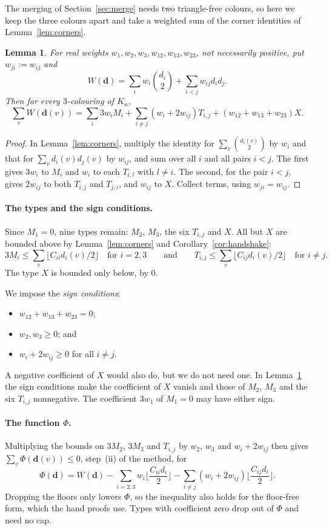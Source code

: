 \documentclass[11pt]{article}
\theoremstyle{spacedplain}
\newtheorem{lemma}[theorem]{Lemma}
\theoremstyle{spaceddef}
\theoremstyle{spacedremark}
\begin{document}
The merging of Section~\ref{sec:merge} needs two triangle-free colours, so here we keep the three colours apart and take a weighted sum of the corner identities of Lemma~\ref{lem:corners}.

\begin{lemma}\label{lem:weighted}
For real weights $w_1,w_2,w_3,w_{12},w_{13},w_{23}$, not necessarily positive, put $w_{ji}:=w_{ij}$ and
\[
W(\mathbf d)=\sum_i w_i\binom{d_i}{2}+\sum_{i<j}w_{ij}d_id_j .
\]
Then for every $3$-colouring of $K_n$,
\[
\sum_vW(\mathbf d(v))=\sum_i 3w_iM_i+\sum_{i\ne j}(w_i+2w_{ij})T_{i,j}+(w_{12}+w_{13}+w_{23})X .
\]
\end{lemma}

\begin{proof}
In Lemma~\ref{lem:corners}, multiply the identity for $\sum_v\binom{d_i(v)}2$ by $w_i$ and that for $\sum_v d_i(v)d_j(v)$ by $w_{ij}$, and sum over all $i$ and all pairs $i<j$.
The first gives $3w_i$ to $M_i$ and $w_i$ to each $T_{i,l}$ with $l\ne i$.
The second, for the pair $i<j$, gives $2w_{ij}$ to both $T_{i,j}$ and $T_{j,i}$, and $w_{ij}$ to $X$.
Collect terms, using $w_{ji}=w_{ij}$.
\end{proof}

\paragraph{The types and the sign conditions.}
Since $M_1=0$, nine types remain: $M_2$, $M_3$, the six $T_{i,j}$ and $X$.
All but $X$ are bounded above by Lemma~\ref{lem:corners} and Corollary~\ref{cor:handshake}:
\[
3M_i\le\sum_v\lfloor C_{ii}d_i(v)/2\rfloor\quad\text{for }i=2,3\qquad\text{and}\qquad T_{i,j}\le\sum_v\lfloor C_{ij}d_i(v)/2\rfloor\quad\text{for }i\ne j.
\]
The type $X$ is bounded only below, by $0$.

We impose the \emph{sign conditions}:
\begin{itemize}
\item $w_{12}+w_{13}+w_{23}=0$;
\item $w_2,w_3\ge 0$; and
\item $w_i+2w_{ij}\ge 0$ for all $i\ne j$.
\end{itemize}
A negative coefficient of $X$ would also do, but we do not need one.
In Lemma~\ref{lem:weighted} the sign conditions make the coefficient of $X$ vanish and those of $M_2$, $M_3$ and the six $T_{i,j}$ nonnegative.
The coefficient $3w_1$ of $M_1=0$ may have either sign.

\paragraph{The function $\Phi$.}
Multiplying the bounds on $3M_2$, $3M_3$ and $T_{i,j}$ by $w_2$, $w_3$ and $w_i+2w_{ij}$ then gives $\sum_v\Phi(\mathbf d(v))\le 0$, step~(ii) of the method, for
\[
\Phi(\mathbf d)=W(\mathbf d)-\sum_{i=2,3}w_i\Big\lfloor\frac{C_{ii}d_i}{2}\Big\rfloor-\sum_{i\ne j}(w_i+2w_{ij})\Big\lfloor\frac{C_{ij}d_i}{2}\Big\rfloor .
\]
Dropping the floors only lowers $\Phi$, so the inequality also holds for the floor-free form, which the hand proofs use.
Types with coefficient zero drop out of $\Phi$ and need no cap.
\end{document}
